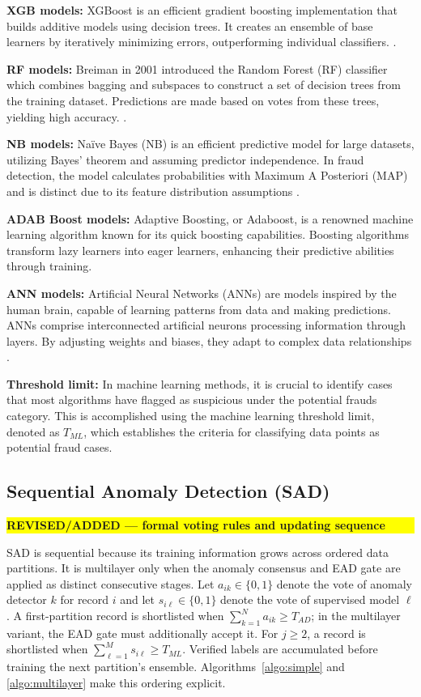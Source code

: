 \documentclass[12pt]{article}
\newcommand{\revmark}[1]{\par\noindent\colorbox{yellow}{%
  \parbox{\dimexpr\linewidth-2\fboxsep}{\raggedright\strut\textbf{#1}}}%
  \par\smallskip}
\begin{document}
    \textbf{\small XGB models:}
XGBoost is an efficient gradient boosting implementation that
builds additive models using decision trees. It creates an
ensemble of base learners by iteratively minimizing errors,
outperforming individual classifiers. \cite{A57}.

    \textbf{\small RF models:}
Breiman in 2001 introduced the Random Forest (RF) classifier which
combines bagging and subspaces to construct a set of decision
trees from the training dataset. Predictions are made based on
votes from these trees, yielding high accuracy.
\cite{A52}.

\textbf{\small NB models:} Na\"ive Bayes (NB) is an efficient
predictive model for large datasets, utilizing Bayes' theorem and
assuming predictor independence. In fraud detection, the model
calculates probabilities with Maximum A Posteriori (MAP) and is
distinct due to its feature distribution assumptions \cite{A52}.

    \textbf{\small ADAB Boost models:}
Adaptive Boosting, or Adaboost, is a renowned machine learning
algorithm known for its quick boosting capabilities. Boosting
algorithms transform lazy learners into eager learners, enhancing
their predictive abilities through training\cite{A52}.

    \textbf{\small ANN models:}
Artificial Neural Networks (ANNs) are models inspired by the human
brain, capable of learning patterns from data and making
predictions. ANNs comprise interconnected artificial neurons
processing information through layers. By adjusting weights and
biases, they adapt to complex data relationships \cite{A52}.


    \textbf{\small Threshold limit:}
In machine learning methods, it is crucial to identify cases that
most algorithms have flagged as suspicious under the potential
frauds category. This is accomplished using the machine learning
threshold limit, denoted as $T_{ML}$, which establishes the
criteria for classifying data points as potential fraud cases.

\subsection{Sequential Anomaly Detection (SAD)}\label{SSC:SAD}
\revmark{REVISED/ADDED --- formal voting rules and updating sequence}
SAD is sequential because its training information grows across ordered data
partitions. It is multilayer only when the anomaly consensus and EAD gate are
applied as distinct consecutive stages. Let $a_{ik}\in\{0,1\}$ denote the vote
of anomaly detector $k$ for record $i$ and let $s_{i\ell}\in\{0,1\}$ denote
the vote of supervised model $\ell$. A first-partition record is shortlisted
when $\sum_{k=1}^{N}a_{ik}\geq T_{AD}$; in the multilayer variant, the EAD gate
must additionally accept it. For $j\geq2$, a record is shortlisted when
$\sum_{\ell=1}^{M}s_{i\ell}\geq T_{ML}$. Verified labels are accumulated before
training the next partition's ensemble. Algorithms~\ref{algo:simple} and
\ref{algo:multilayer} make this ordering explicit.
\end{document}
